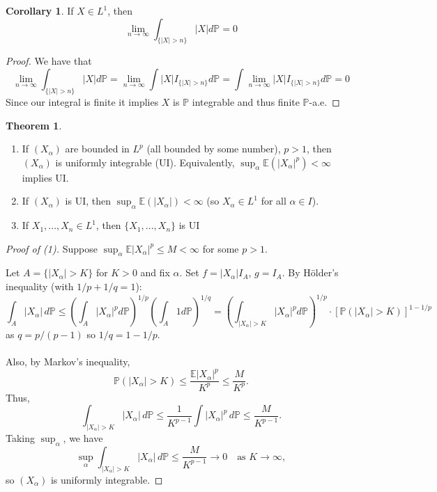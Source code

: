 \documentclass[11pt,a4paper]{article}
\theoremstyle{definition}
\newtheorem{theorem}{Theorem}[section]
\newtheorem{corollary}{Corollary}[section]
\begin{document}
\begin{corollary}
    If $X \in L^1$, then \[
    \lim \limits _{n \to \infty} \int _{\{|X| > n\}} |X|d \mathbb{P} = 0
    \]
\end{corollary}

\begin{proof}
    We have that \[
    \lim \limits _{n \to \infty} \int _{\{|X| > n\}} |X|d \mathbb{P} = \lim \limits _{n \to \infty} \int |X| I_{\{|X| > n\}}d \mathbb{P} = \int \lim \limits _{n \to \infty}|X| I_{\{|X| > n\}}d \mathbb{P} =0
    \]
    Since our integral is finite it implies $X$ is $\mathbb{P}$ integrable and thus finite $\mathbb{P}$-a.e.
\end{proof}

\begin{theorem} \label{thm:ui-L}
\leavevmode
\begin{enumerate}
    \item If $(X_\alpha)$ are bounded in $L^p$ (all bounded by some number), $p>1$, then $(X_\alpha)$ is uniformly integrable (UI). Equivalently, $\sup_\alpha \mathbb{E}(|X_\alpha|^p)<\infty$ implies UI.
    \item If $(X_\alpha)$ is UI, then $\sup_\alpha \mathbb{E}(|X_\alpha|)<\infty$ (so $X_{\alpha} \in L^1$ for all $\alpha \in I$).
    \item If $X_1, ..., X_n \in L^1$, then $\{X_1, ..., X_n\}$ is UI
\end{enumerate}
\end{theorem}

\begin{proof}[Proof of (1)]
Suppose $\sup_\alpha \mathbb{E}|X_\alpha|^p \leq M < \infty$ for some $p>1$.

Let $A = \{|X_\alpha| > K\}$ for $K>0$ and fix $\alpha$. Set $f = |X_\alpha|I_A$, $g = I_A$. By Hölder's inequality (with $1/p + 1/q = 1$):
\[
\int_A |X_\alpha|\, d\mathbb{P}
\leq \left( \int_A |X_\alpha|^p d\mathbb{P} \right)^{1/p}
\left( \int_A 1 d\mathbb{P} \right)^{1/q}
= \left( \int_{|X_\alpha| > K} |X_\alpha|^p d\mathbb{P} \right)^{1/p}
    \cdot [\mathbb{P}(|X_\alpha| > K)]^{1 - 1/p}
\]
as $q = p/(p-1)$ so $1/q = 1 - 1/p$.
~\\~\\
Also, by Markov's inequality,
\[
\mathbb{P}(|X_\alpha|>K)
\leq \frac{\mathbb{E}|X_\alpha|^p}{K^p}
\leq \frac{M}{K^p}.
\]
Thus,
\[
\int_{|X_\alpha|>K} |X_\alpha|\, d\mathbb{P}
\leq \frac{1}{K^{p-1}} \int |X_\alpha|^p\, d\mathbb{P}
\leq \frac{M}{K^{p-1}}.
\]
Taking $\sup_\alpha$, we have
\[
\sup_\alpha \int_{|X_\alpha| > K} |X_\alpha|\, d\mathbb{P}
    \leq \frac{M}{K^{p-1}} \longrightarrow 0 \quad \text{as } K \rightarrow \infty,
\]
so $(X_\alpha)$ is uniformly integrable.
\end{proof}
\end{document}
